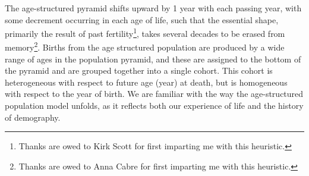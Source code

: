  \FloatBarrier
The age-structured pyramid shifts upward by 1 year with
each passing year, with some decrement occurring in each age of life, such that
the essential shape, primarily the result of past fertility\footnote{Thanks are
owed to Kirk Scott for first imparting me with this heuristic.}, takes several
decades to be erased from memory\footnote{Thanks are owed to Anna Cabre for first
imparting me with this heuristic.}. Births from the age structured population 
are produced by a wide range of ages in the population pyramid, and these
are assigned to the bottom of the pyramid and are grouped together into a single
cohort. This cohort is heterogeneous with respect to future age (year) at death, 
but is homogeneous with respect to the year of birth. We are familiar with
the way the age-structured population model unfolds, as it
reflects both our experience of life and the history of demography.